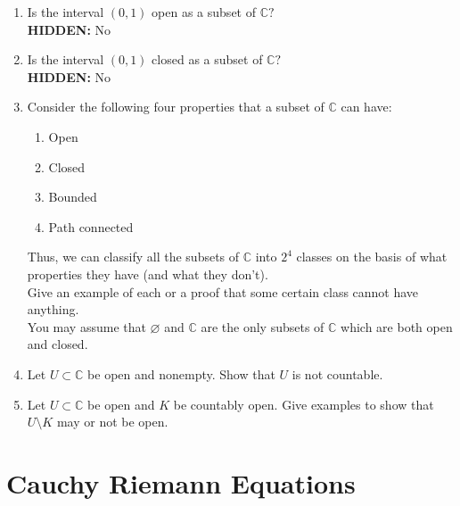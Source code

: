 \documentclass[12pt]{article}
\theoremstyle{definition}
\numberwithin{thm}{section}
\let\emptyset\varnothing
\newcommand{\hint}[1]{\textbf{HIDDEN:} {\color[rgb]{0.95, 0.95, 0.95}#1}}
\begin{document}
\begin{enumerate}
	\item Is the interval $(0, 1)$ open as a subset of $\mathbb{C}?$\\
	\hint{No}
	\item Is the interval $(0, 1)$ closed as a subset of $\mathbb{C}?$\\
	\hint{No}
	\item Consider the following four properties that a subset of $\mathbb{C}$ can have:
	\begin{enumerate}
		\item Open
		\item Closed
		\item Bounded
		\item Path connected
	\end{enumerate}
	Thus, we can classify all the subsets of $\mathbb{C}$ into $2^4$ classes on the basis of what properties they have (and what they don't).\\
	Give an example of each or a proof that some certain class cannot have anything.\\
	You may assume that $\emptyset$ and $\mathbb{C}$ are the only subsets of $\mathbb{C}$ which are both open and closed.
	\item Let $U \subset \mathbb{C}$ be open and nonempty. Show that $U$ is not countable.
	\item Let $U \subset \mathbb{C}$ be open and $K$ be countably open. Give examples to show that $U\setminus K$ may or not be open.
\end{enumerate}
\newpage\section{Cauchy Riemann Equations}
\end{document}
